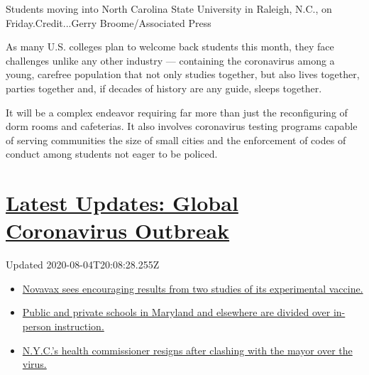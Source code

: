 Students moving into North Carolina State University in Raleigh, N.C.,
on Friday.Credit...Gerry Broome/Associated Press

As many U.S. colleges plan to welcome back students this month, they
face challenges unlike any other industry --- containing the coronavirus
among a young, carefree population that not only studies together, but
also lives together, parties together and, if decades of history are any
guide, sleeps together.

It will be a complex endeavor requiring far more than just the
reconfiguring of dorm rooms and cafeterias. It also involves coronavirus
testing programs capable of serving communities the size of small cities
and the enforcement of codes of conduct among students not eager to be
policed.

\hypertarget{latest-updates-global-coronavirus-outbreak}{%
\section{\texorpdfstring{\href{https://www.nytimes3xbfgragh.onion/2020/08/04/world/coronavirus-cases.html?action=click\&pgtype=Article\&state=default\&region=MAIN_CONTENT_1\&context=storylines_live_updates}{Latest
Updates: Global Coronavirus
Outbreak}}{Latest Updates: Global Coronavirus Outbreak}}\label{latest-updates-global-coronavirus-outbreak}}

Updated 2020-08-04T20:08:28.255Z

\begin{itemize}
\tightlist
\item
  \href{https://www.nytimes3xbfgragh.onion/2020/08/04/world/coronavirus-cases.html?action=click\&pgtype=Article\&state=default\&region=MAIN_CONTENT_1\&context=storylines_live_updates\#link-1228a480}{Novavax
  sees encouraging results from two studies of its experimental
  vaccine.}
\item
  \href{https://www.nytimes3xbfgragh.onion/2020/08/04/world/coronavirus-cases.html?action=click\&pgtype=Article\&state=default\&region=MAIN_CONTENT_1\&context=storylines_live_updates\#link-4825b93}{Public
  and private schools in Maryland and elsewhere are divided over
  in-person instruction.}
\item
  \href{https://www.nytimes3xbfgragh.onion/2020/08/04/world/coronavirus-cases.html?action=click\&pgtype=Article\&state=default\&region=MAIN_CONTENT_1\&context=storylines_live_updates\#link-4d1eafa8}{N.Y.C.'s
  health commissioner resigns after clashing with the mayor over the
  virus.}
\end{itemize}

